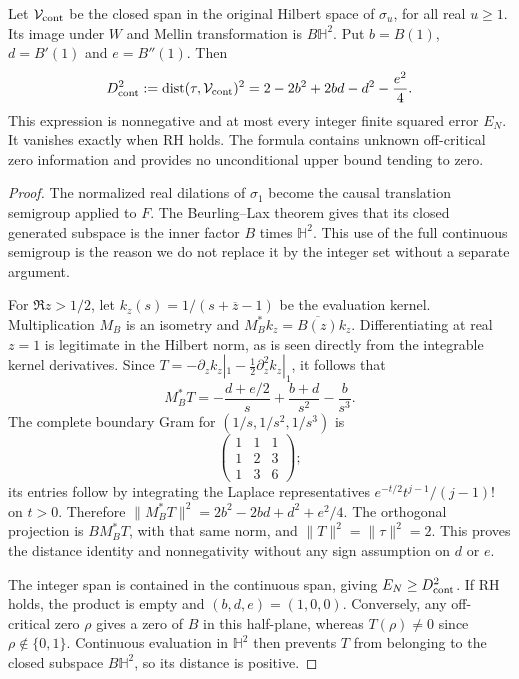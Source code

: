 \begin{proposition}
\label{prop:ns76-continuous-distance}
Let $\mathcal V_{\rm cont}$ be the closed span in the original Hilbert
space of $\sigma_u$, for all real $u\geq1$. Its image under $W$ and
Mellin transformation is $B\mathbb H^2$.
Put $b=B(1)$, $d=B'(1)$ and $e=B''(1)$. Then
\begin{equation}
 D_{\rm cont}^2:=\operatorname{dist}(\tau,\mathcal V_{\rm cont})^2
 =2-2b^2+2bd-d^2-\frac{e^2}{4}.
 \label{eq:ns76-continuous-distance}
\end{equation}
This expression is nonnegative and at most every integer finite
squared error $E_N$. It vanishes exactly when RH holds.
The formula contains unknown off-critical zero information and
provides no unconditional upper bound tending to zero.
\end{proposition}
\begin{proof}
The normalized real dilations of $\sigma_1$ become the causal
translation semigroup applied to $F$. The Beurling--Lax theorem gives
that its closed generated subspace is the inner factor $B$ times
$\mathbb H^2$. This use of the full continuous semigroup is the reason
we do not replace it by the integer set without a separate argument.

For $\Re z>1/2$, let $k_z(s)=1/(s+\overline z-1)$ be the evaluation
kernel. Multiplication $M_B$ is an isometry and
$M_B^*k_z=\overline{B(z)}k_z$.
Differentiating at real $z=1$ is legitimate in the Hilbert norm,
as is seen directly from the integrable kernel derivatives. Since
$T=-\partial_z k_z|_1-\tfrac12\partial_z^2 k_z|_1$, it follows that
\[
 M_B^*T=-\frac{d+e/2}{s}+\frac{b+d}{s^2}-\frac{b}{s^3}.
\]
The complete boundary Gram for $(1/s,1/s^2,1/s^3)$ is
\[
 \begin{pmatrix}1&1&1\\1&2&3\\1&3&6\end{pmatrix};
\]
its entries follow by integrating the Laplace representatives
$e^{-t/2}t^{j-1}/(j-1)!$ on $t>0$.
Therefore $\|M_B^*T\|^2=2b^2-2bd+d^2+e^2/4$.
The orthogonal projection is $B M_B^*T$, with that same norm, and
$\|T\|^2=\|\tau\|^2=2$. This proves the distance identity and
nonnegativity without any sign assumption on $d$ or $e$.

The integer span is contained in the continuous span, giving
$E_N\geq D_{\rm cont}^2$. If RH holds, the product is empty and
$(b,d,e)=(1,0,0)$. Conversely, any off-critical zero $\rho$ gives a
zero of $B$ in this half-plane, whereas $T(\rho)\ne0$ since
$\rho\notin\{0,1\}$. Continuous evaluation in $\mathbb H^2$ then
prevents $T$ from belonging to the closed subspace $B\mathbb H^2$,
so its distance is positive.
\end{proof}

